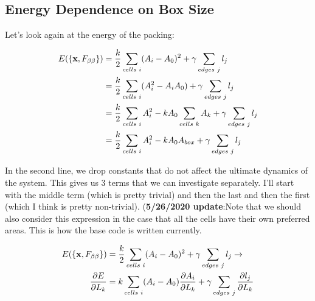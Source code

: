\documentclass[12pt]{article}
\begin{document}
\subsection{Energy Dependence on Box Size}
Let's look again at the energy of the packing:
\begin{center}
\begin{equation}
\begin{split}
E(\{\vb{x}, F_{\beta\beta}\}) &=  \frac{k}{2} \sum\limits_{cells \hspace{1mm} i} (A_i - A_0)^2 + \gamma \sum\limits_{edges \hspace{1mm} j} l_j\\
&= \frac{k}{2} \sum\limits_{cells \hspace{1mm} i} (A_i^2 - A_i A_0) + \gamma \sum\limits_{edges \hspace{1mm} j} l_j\\
&= \frac{k}{2} \sum\limits_{cells \hspace{1mm} i} A_i^2 - k A_0\sum\limits_{cells \hspace{1mm} k} A_k + \gamma \sum\limits_{edges \hspace{1mm} j} l_j\\
&= \frac{k}{2}  \sum\limits_{cells \hspace{1mm} i} A_i^2 - k A_0 A_{box} + \gamma \sum\limits_{edges \hspace{1mm} j} l_j\\
\end{split}
\end{equation}
\end{center}
In the second line, we drop constants that do not affect the ultimate dynamics of the system. This gives us 3 terms that we can investigate separately. I'll start with the middle term (which is pretty trivial) and then the last and then the first (which I think is pretty non-trivial). (\textbf{5/26/2020 update}:Note that we should also consider this expression in the case that all the cells have their own preferred areas. This is how the base code is written currently.
\begin{center}
\begin{equation}
\begin{split}
E(\{\vb{x}, F_{\beta\beta}\}) &=  \frac{k}{2} \sum\limits_{cells \hspace{1mm} i} (A_i - A_0)^2 + \gamma \sum\limits_{edges \hspace{1mm} j} l_j \rightarrow\\
\pdv{E}{L_k}&= k\sum\limits_{cells \hspace{1mm} i} (A_i - A_0) \pdv{A_i}{L_k}+ \gamma \sum\limits_{edges \hspace{1mm} j} \pdv{l_j}{L_k}
\end{split}
\end{equation}
\end{center}
\end{document}
